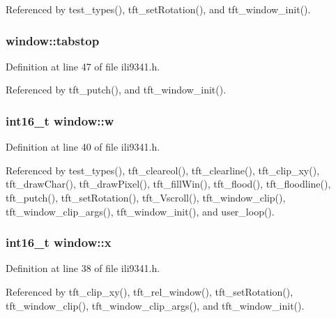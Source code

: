 Referenced by test\+\_\+types(), tft\+\_\+set\+Rotation(), and tft\+\_\+window\+\_\+init().

\subsubsection[{\texorpdfstring{tabstop}{tabstop}}]{ window\+::tabstop}\hypertarget{structwindow_a88d2836d45dd428d8fadfd703f0f965f}{}\label{structwindow_a88d2836d45dd428d8fadfd703f0f965f}


Definition at line 47 of file ili9341.\+h.



Referenced by tft\+\_\+putch(), and tft\+\_\+window\+\_\+init().

\subsubsection[{\texorpdfstring{w}{w}}]{\setlength{\rightskip}{0pt plus 5cm}int16\+\_\+t window\+::w}\hypertarget{structwindow_ad89fdeb11ce94e2e7501f7290372d6ae}{}\label{structwindow_ad89fdeb11ce94e2e7501f7290372d6ae}


Definition at line 40 of file ili9341.\+h.



Referenced by test\+\_\+types(), tft\+\_\+cleareol(), tft\+\_\+clearline(), tft\+\_\+clip\+\_\+xy(), tft\+\_\+draw\+Char(), tft\+\_\+draw\+Pixel(), tft\+\_\+fill\+Win(), tft\+\_\+flood(), tft\+\_\+floodline(), tft\+\_\+putch(), tft\+\_\+set\+Rotation(), tft\+\_\+\+Vscroll(), tft\+\_\+window\+\_\+clip(), tft\+\_\+window\+\_\+clip\+\_\+args(), tft\+\_\+window\+\_\+init(), and user\+\_\+loop().

\subsubsection[{\texorpdfstring{x}{x}}]{\setlength{\rightskip}{0pt plus 5cm}int16\+\_\+t window\+::x}\hypertarget{structwindow_a879b99940dfc34772f0257f54c67b817}{}\label{structwindow_a879b99940dfc34772f0257f54c67b817}


Definition at line 38 of file ili9341.\+h.



Referenced by tft\+\_\+clip\+\_\+xy(), tft\+\_\+rel\+\_\+window(), tft\+\_\+set\+Rotation(), tft\+\_\+window\+\_\+clip(), tft\+\_\+window\+\_\+clip\+\_\+args(), and tft\+\_\+window\+\_\+init().

